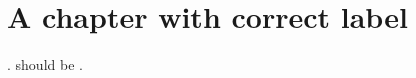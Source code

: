 \documentclass{grattan}
\begin{document}
\chapter{A chapter with correct label}\label{chap:good}.
 should be .
\end{document}
